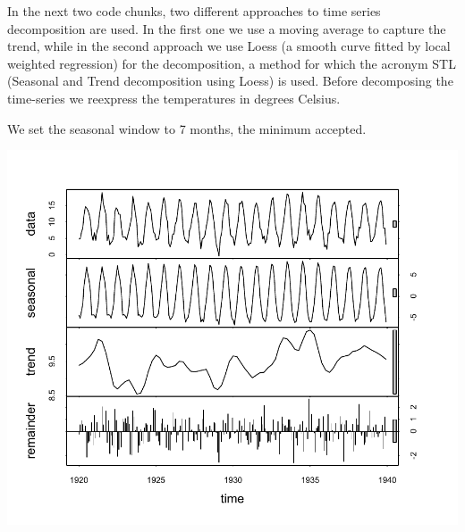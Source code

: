 \documentclass[krantz2]{krantz}\usepackage{knitr}
\begin{document}
In the next two code chunks, two different approaches to time series decomposition are used. In the first one we use a moving average to capture the trend, while in the second approach we use Loess (a smooth curve fitted by local weighted regression) for the decomposition, a method for which the acronym STL (Seasonal and Trend decomposition using Loess) is used. Before decomposing the time-series we reexpress the temperatures in degrees Celsius.

\begin{knitrout}\footnotesize
{}\color{fgcolor}\begin{kframe}
\begin{alltt}
 \hlkwb{<-}  \hlopt{-} \hlstd{)} \hlopt{*} \hlopt{/}
\end{alltt}
\end{kframe}
\end{knitrout}

We set the seasonal window to 7 months, the minimum accepted.


\begin{knitrout}\footnotesize
{}\color{fgcolor}\begin{kframe}
\begin{alltt}
 \hlkwb{<-}   \hlstd{=} \hlstd{)}
\end{alltt}
\end{kframe}

{\centering \includegraphics[width=.7\textwidth]{figure/pos-ts-05-1} 

}



\end{knitrout}
\end{document}
